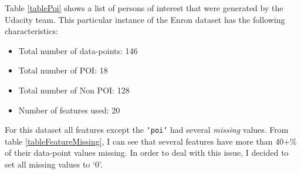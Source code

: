 \documentclass[titlepage,numbers=noenddot,headinclude,%
               footinclude=true,abstractoff,BCOR=5mm,%
               paper=a4,fontsize=11pt,ngerman,american]{scrreprt}
\numberwithin{theorem}{chapter}
\numberwithin{definition}{chapter}
\numberwithin{algorithm}{chapter}
\numberwithin{figure}{chapter}
\numberwithin{table}{chapter}
\numberwithin{equation}{chapter}
\begin{document}
Table \ref{tablePoi} shows a list of persons of interest that were generated by the Udacity team. This particular instance of the Enron dataset has the following characteristics:
\begin{itemize}
    \item Total number of data-points: 146
    \item Total number of POI: 18
    \item Total number of Non POI: 128
    \item Number of features used: 20
\end{itemize}
For this dataset all features except the \texttt{`poi'} had several \textit{missing} values. From table \ref{tableFeatureMissing}, I can see that several features have more than 40+\% of their data-point values missing. In order to deal with this issue, I decided to set all missing values to `0'.
\end{document}
